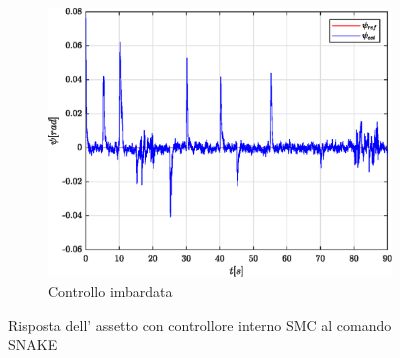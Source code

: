 \begin{figure}
\begin{subfigure}{0.45\textwidth}
		\centering
		\includegraphics[width=1\textwidth]{Simulazioni/Figure/SMC/SNAKE/AttitudeControlYaw}
		\caption{Controllo imbardata}
	\end{subfigure}
	\caption{Risposta dell' assetto con controllore interno SMC al comando SNAKE}
\end{figure}


